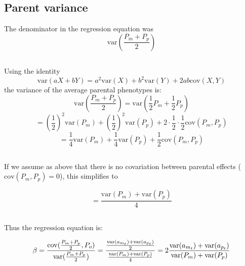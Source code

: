 \documentclass[
  letterpaper,
  DIV=11,
  numbers=noendperiod]{scrartcl}
\begin{document}
\subsection{Parent variance}\label{parent-variance}

The denominator in the regression equation was \[
\mathrm{var}(\frac{P_m + P_p}{2})
\]

\subsection{}\label{section-15}

Using the identity \[
\mathrm{var}(aX + bY) = a^2\mathrm{var}(X) + b^2\mathrm{var}(Y) + 2ab\mathrm{cov}(X, Y)
\] the variance of the average parental phenotypes is: \[
\mathrm{var}(\frac{P_m + P_p}{2}) = \mathrm{var}(\frac{1}{2}P_m + \frac{1}{2} P_p)
\] \[
= \left(\frac{1}{2}\right)^2\mathrm{var}(P_m) + \left(\frac{1}{2}\right)^2\mathrm{var}(P_p) + 2 \cdot \frac{1}{2} \cdot \frac{1}{2} \mathrm{cov}(P_m, P_p)
\] \[
= \frac{1}{4}\mathrm{var}(P_m) + \frac{1}{4}\mathrm{var}(P_p) + \frac{1}{2} \mathrm{cov}(P_m, P_p)
\]

\subsection{}\label{section-16}

If we assume as above that there is no covariation between parental
effects (\(\mathrm{cov}(P_m, P_p) = 0\)), this simplifies to

\[
= \frac{\mathrm{var}(P_m) + \mathrm{var}(P_p)}{4}
\]

\subsection{}\label{section-17}

Thus the regression equation is:

\[
\beta = \frac{\mathrm{cov}(\frac{P_m + P_p}{2}, P_o)}{\mathrm{var}(\frac{P_m + P_p}{2})} \\
= \frac{\frac{\mathrm{var}(a_{m_{t}}) + \mathrm{var}(a_{p_t})}{2}}{\frac{\mathrm{var}(P_m) + \mathrm{var}(P_p)}{4}} \\
= 2\frac{\mathrm{var}(a_{m_{t}}) + \mathrm{var}(a_{p_t})}{\mathrm{var}(P_m) + \mathrm{var}(P_p)}
\]

\subsection{}\label{section-18}
\end{document}
